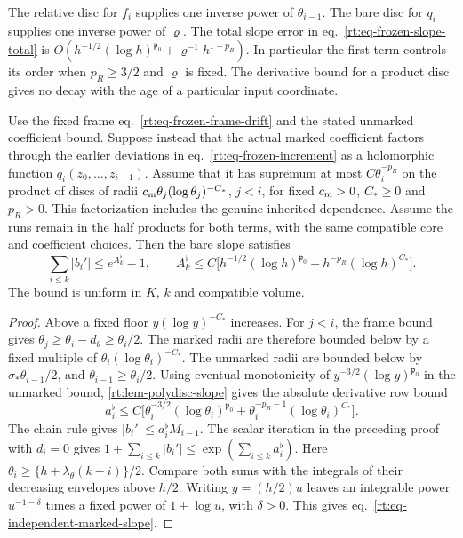 \documentclass[11pt,letterpaper,reqno]{amsart}
\makeatletter
\numberwithin{equation}{section}
\renewcommand{\eqref}[1]{\textup{eq.~\ref{#1}}}
\theoremstyle{definition}
\newcommand{\ms@minorstart}{%
  \pushQED{\qed}\renewcommand{\qedsymbol}{$\blacksquare$}}
\newenvironment{proposition}[1][]{\ms@minorstart\ms@proposition[#1]}
  {\popQED\endms@proposition}
\theoremstyle{remark}
\makeatother
\begin{document}
The relative disc for $f_i$ supplies one inverse power of
$\theta_{i-1}$. The bare disc for $q_i$ supplies one inverse power
of $\varrho$. The total slope error in
\eqref{rt:eq-frozen-slope-total} is
$O(h^{-1/2}(\log h)^{\mathfrak p_0}+\varrho^{-1}h^{1-p_R})$.
In particular the first term controls its order when $p_R\ge3/2$ and
$\varrho$ is fixed. The derivative bound for a product disc gives no
decay with the age of a particular input coordinate.

\begin{proposition}[Slope with an independent marked polydisc]
\label{rt:prop-independent-marked-slope}
Use the fixed frame \eqref{rt:eq-frozen-frame-drift} and the
stated unmarked coefficient bound. Suppose instead that the actual
marked coefficient factors through the earlier deviations in
\eqref{rt:eq-frozen-increment} as a
holomorphic function $q_i(z_0,\ldots,z_{i-1})$. Assume that it has
supremum at most $C\theta_i^{-p_R}$ on the product of discs of radii
$c_{\rm m}\theta_j(\log\theta_j)^{-C_*}$, $j<i$, for fixed $c_{\rm m}>0$,
$C_*\ge0$ and $p_R>0$. This factorization includes the genuine
inherited dependence. Assume the runs remain in the half products
for both terms, with the same compatible core and coefficient
choices. Then the bare slope satisfies
\begin{equation}\label{rt:eq-independent-marked-slope}
   \sum_{i\le k}|b_i'|\le e^{A_k^\flat}-1,
   \qquad
   A_k^\flat\le C\bigl[h^{-1/2}(\log h)^{\mathfrak p_0}
                         +h^{-p_R}(\log h)^{C_*}\bigr].
\end{equation}
The bound is uniform in $K$, $k$ and compatible volume.
\end{proposition}
\begin{proof}
Above a fixed floor $y(\log y)^{-C_*}$ increases. For $j<i$,
the frame bound gives $\theta_j\ge\theta_i-d_\theta\ge\theta_i/2$.
The marked radii are therefore bounded below by a fixed multiple
of $\theta_i(\log\theta_i)^{-C_*}$. The unmarked radii are bounded
below by $\sigma_*\theta_{i-1}/2$, and $\theta_{i-1}\ge\theta_i/2$.
Using eventual monotonicity of $y^{-3/2}(\log y)^{\mathfrak p_0}$
in the unmarked bound, \cref{rt:lem-polydisc-slope} gives the
absolute derivative row bound
\[
  a_i^\flat\le C\bigl[\theta_i^{-3/2}(\log\theta_i)^{\mathfrak p_0}
                   +\theta_i^{-p_R-1}(\log\theta_i)^{C_*}\bigr].
\]
The chain rule gives $|b_i'|\le a_i^\flat M_{i-1}$. The scalar
iteration in the preceding proof with $d_i=0$ gives
$1+\sum_{i\le k}|b_i'|\le\exp(\sum_{i\le k}a_i^\flat)$. Here
$\theta_i\ge\{h+\lambda_\theta(k-i)\}/2$. Compare both sums with
the integrals of their decreasing envelopes above $h/2$.
Writing $y=(h/2)u$ leaves an integrable power $u^{-1-\delta}$
times a fixed power of $1+\log u$, with $\delta>0$. This gives
\eqref{rt:eq-independent-marked-slope}.
\end{proof}
\end{document}
